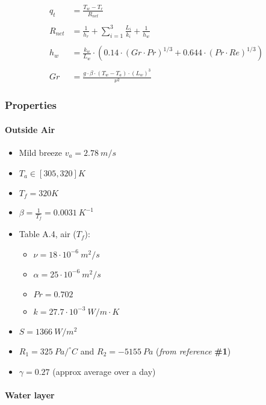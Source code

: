 \documentclass[11pt]{article}
\providecommand{\tightlist}{%
      \setlength{\itemsep}{0pt}\setlength{\parskip}{0pt}}
\begin{document}
\begin{align*}
  q_t &= \frac{T_w - T_r}{R_{net}} \\
\\
  R_{net} &= \frac{1}{h_r} + \sum_{i=1}^{3} \frac{L_i}{k_i} + \frac{1}{h_{w}} \\
\\
  h_w &= \frac{k_w}{L_w}\cdot (0.14\cdot(Gr\cdot Pr)^{1/3} + 0.644\cdot (Pr\cdot Re)^{1/3}) \\
\\
  Gr &= \frac{g\cdot\beta\cdot(T_w-T_a)\cdot(L_w)^{3}}{\nu^2}
\end{align*}

    \hypertarget{properties}{%
\subsubsection{Properties}\label{properties}}

\hypertarget{outside-air}{%
\paragraph{Outside Air}\label{outside-air}}

\begin{itemize}
\tightlist
\item
  Mild breeze \(v_a = 2.78\ m/s\)
\item
  \(T_a \in [305, 320] K\)
\item
  \(T_f = 320K\)
\item
  \(\beta = \frac{1}{T_f} = 0.0031\ K^{-1}\)
\item
  Table A.4, air (\(T_f\)):

  \begin{itemize}
  \tightlist
  \item
    \(\nu = 18 \cdot 10^{-6}\ m^2/s\)
  \item
    \(\alpha = 25 \cdot 10^{-6}\ m^2/s\)
  \item
    \(Pr = 0.702\)
  \item
    \(k = 27.7 \cdot 10^{-3}\ W/m\cdot K\)
  \end{itemize}
\item
  \(S = 1366\ W/m^2\)
\item
  \(R_1=325\ Pa/^\circ C\) and \(R_2 = -5155\ Pa\) (\emph{from
  reference} \textbf{\#1})
\item
  \(\gamma=0.27\) (approx average over a day)
\end{itemize}

\hypertarget{water-layer}{%
\paragraph{Water layer}\label{water-layer}}
\end{document}

